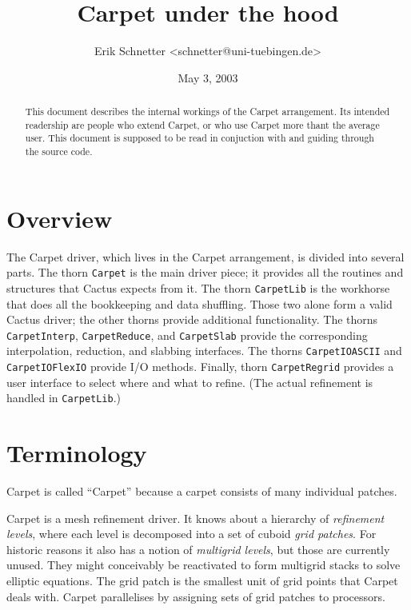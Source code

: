 \documentclass{article}
\begin{document}
\title{Carpet under the hood}
\author{Erik Schnetter \textless schnetter@uni-tuebingen.de\textgreater}
\date{May 3, 2003}
\maketitle

\begin{abstract}
   This document describes the internal workings of the Carpet
   arrangement.  Its intended readership are people who extend Carpet,
   or who use Carpet more thant the average user.  This document is
   supposed to be read in conjuction with and guiding through the
   source code.
\end{abstract}

\tableofcontents

\section{Overview}

   The Carpet driver, which lives in the Carpet arrangement, is
   divided into several parts.  The thorn \texttt{Carpet} is the main
   driver piece; it provides all the routines and structures that
   Cactus expects from it.  The thorn \texttt{CarpetLib} is the
   workhorse that does all the bookkeeping and data shuffling.  Those
   two alone form a valid Cactus driver; the other thorns provide
   additional functionality.  The thorns \texttt{CarpetInterp},
   \texttt{CarpetReduce}, and \texttt{CarpetSlab} provide the
   corresponding interpolation, reduction, and slabbing interfaces.
   The thorns \texttt{CarpetIOASCII} and \texttt{CarpetIOFlexIO}
   provide I/O methods.  Finally, thorn \texttt{CarpetRegrid} provides
   a user interface to select where and what to refine.  (The actual
   refinement is handled in \texttt{CarpetLib}.)



\section{Terminology}

   Carpet is called ``Carpet'' because a carpet consists of many
   individual patches.

   Carpet is a mesh refinement driver.  It knows about a hierarchy of
   \emph{refinement levels}, where each level is decomposed into a set
   of cuboid \emph{grid patches}.  For historic reasons it also has a
   notion of \emph{multigrid levels}, but those are currently unused.
   They might conceivably be reactivated to form multigrid stacks to
   solve elliptic equations.  The grid patch is the smallest unit of
   grid points that Carpet deals with.  Carpet parallelises by
   assigning sets of grid patches to processors.
\end{document}
